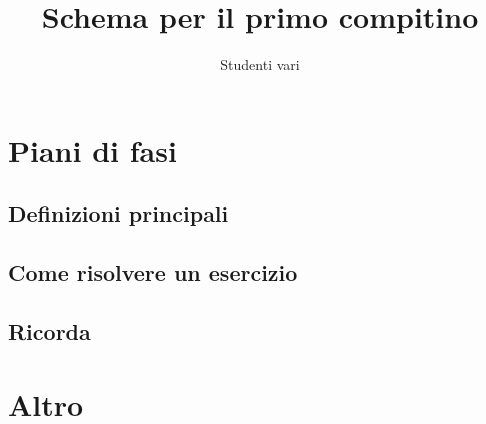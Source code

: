 \documentclass[a4paper,12pt]{book}
\author{Studenti vari}
\title{Schema per il primo compitino}
\begin{document}
\maketitle

\section{Piani di fasi}
\subsection{Definizioni principali}

\subsection{Come risolvere un esercizio}

\subsection{Ricorda}

\section{Altro}
\end{document}
